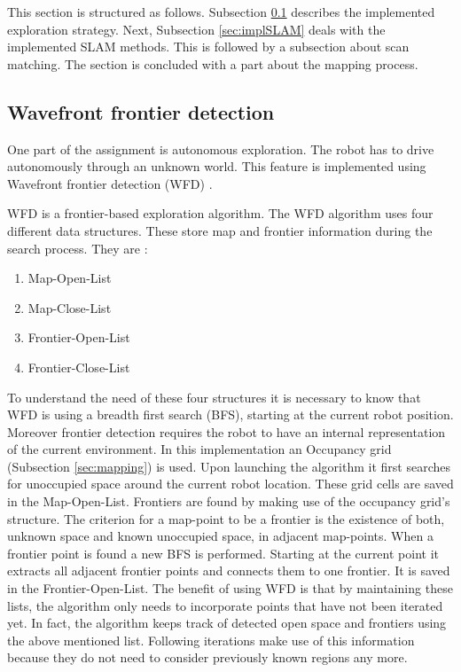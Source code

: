 \documentclass{ba-kecs}
\begin{document}
This section is structured as follows. Subsection \ref{sec:wfd} describes the implemented exploration strategy. Next, Subsection \ref{sec:implSLAM} deals with the implemented SLAM methods. This is followed by a subsection about scan matching. The section is concluded with a part about the mapping process. 

\subsection{Wavefront frontier detection}
\label{sec:wfd}
One part of the assignment is autonomous exploration. The robot has to drive autonomously through an unknown world. This feature is implemented using Wavefront frontier detection (WFD) \citep{Keidar}.

WFD is a frontier-based exploration algorithm. The WFD algorithm uses four different data structures. These store map and frontier information during the search process. They are :
\begin{enumerate}
\item{Map-Open-List}
\item{Map-Close-List}
\item{Frontier-Open-List}
\item{Frontier-Close-List}
\end{enumerate}
To understand the need of these four structures it is necessary to know that WFD is using a breadth first search (BFS), starting at the current robot position. Moreover frontier detection requires the robot to have an internal representation of the current environment. In this implementation an Occupancy grid (Subsection \ref{sec:mapping}) is used.
Upon launching the algorithm it first searches for unoccupied space around the current robot location. These grid cells are saved in the Map-Open-List. 
Frontiers are found by making use of the occupancy grid's structure. The criterion for a map-point to be a frontier is the existence of both, unknown space and known unoccupied space, in adjacent map-points. When a frontier point is found a new BFS is performed. Starting at the current point it extracts all adjacent frontier points and connects them to one frontier. It is saved in the Frontier-Open-List. The benefit of using WFD is that by maintaining these lists, the algorithm only needs to incorporate points that have not been iterated yet. In fact, the algorithm keeps track of detected open space and frontiers using the above mentioned list. Following iterations make use of this information because they do not need to consider previously known regions any more.
 
\end{document}
